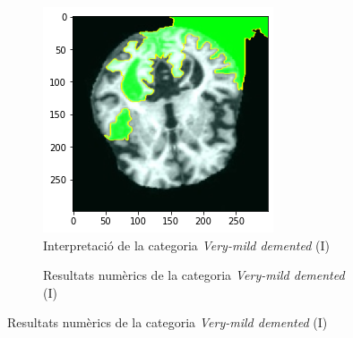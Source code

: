 \documentclass[a4paper,12pt]{report}
\begin{document}
\begin{figure}[h!]
    \centering
    \begin{subfigure}[b]{0.40\linewidth}
        \includegraphics[width=\linewidth]{images/Very mildly.png}
        \caption{Interpretació de la categoria \textit{Very-mild demented} (I)}
        \label{fig:VMD1}
    \end{subfigure}
    \begin{subfigure}[b]{0.40\linewidth}
        \caption{Resultats numèrics de la categoria \textit{Very-mild demented} (I)}
        \label{fig:ClassificacioVMD1}
    \end{subfigure}

\end{figure}
\end{document}
